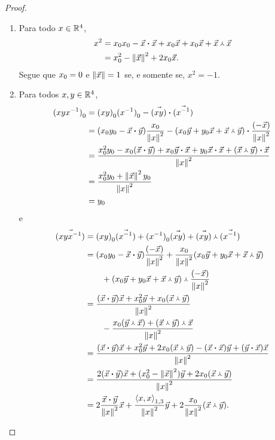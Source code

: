 \begin{proof}
\begin{enumerate}
	\item Para todo $x \in \mathbb{R}^4$,
		\begin{align*}
		x^2 &= {x}_0{x}_0 - {\vec{x}} \bm{\cdot} {\vec{x}}+{x}_0\vec{x}+{x}_0\vec{x}+{\vec{x}} \Yup {\vec{x}} \\
			&= {x}_0^2 - \left\Vert{\vec{x}}\right\Vert^2 + 2{x}_0\vec{x}.
		\end{align*}
Segue que ${x}_0=0$ e $\left\Vert{\vec{x}}\right\Vert=1$ se, e somente se, $x^2=-1$.

	\item Para todos $x,y \in \mathbb{R}^4$,
		\begin{align*}
		{(xyx^{-1})}_0 &= {(xy)}_0{(x^{-1})}_0 - {\vec{(xy)}} \bm{\cdot} {\vec{(x^{-1})}} \\
			&= ({x}_0{y}_0 - {\vec{x}} \bm{\cdot} {\vec{y}})\frac{{x}_0}{\left\Vert{x}\right\Vert^2} - {({x}_0\vec{y} + {y}_0\vec{x} + {\vec{x}} \Yup {\vec{y}})} \bm{\cdot} {\frac{(-\vec{x})}{\left\Vert{x}\right\Vert^2}} \\
			&= \frac{{x}_0^2{y}_0 - {x}_0({\vec{x}} \bm{\cdot} {\vec{y}}) + {x}_0{\vec{y}} \bm{\cdot} {\vec{x}} + {y}_0{\vec{x}} \bm{\cdot} {\vec{x}} + {({\vec{x}} \Yup {\vec{y}})} \bm{\cdot} {\vec{x}}}{\left\Vert{x}\right\Vert^2} \\
			&= \frac{{x}_0^2{y}_0 + \left\Vert{\vec{x}}\right\Vert^2{y}_0}{\left\Vert{x}\right\Vert^2} \\
			&= {y}_0
		\end{align*}
e
		\begin{align*}
		\vec{(xyx^{-1})} &= {(xy)}_0\vec{(x^{-1})} + {(x^{-1})}_0\vec{(xy)} + {\vec{(xy)}} \Yup {\vec{(x^{-1})}} \\
			&= ({x}_0{y}_0 - {\vec{x}} \bm{\cdot} {\vec{y}})\frac{(-\vec{x})}{\left\Vert{x}\right\Vert^2} 
			+ \frac{{x}_0}{\left\Vert{x}\right\Vert^2}({x}_0\vec{y} + {y}_0\vec{x} + {\vec{x}} \Yup {\vec{y}}) \\
				&\qquad + {({x}_0\vec{y} + {y}_0\vec{x} + {\vec{x}} \Yup {\vec{y}})} \Yup {\frac{(-\vec{x})}{\left\Vert{x}\right\Vert^2}} \\
			&= \frac{({\vec{x}} \bm{\cdot} {\vec{y}})\vec{x} + {x}_0^2\vec{y} + {x}_0({\vec{x}} \Yup {\vec{y}})}{\left\Vert{x}\right\Vert^2} \\
				&\qquad - \frac{{x}_0({\vec{y}} \Yup {\vec{x})} + {({\vec{x}} \Yup {\vec{y}})} \Yup {\vec{x}}}{\left\Vert{x}\right\Vert^2} \\
			&= \frac{({\vec{x}} \bm{\cdot} {\vec{y}})\vec{x}+ {x}_0^2\vec{y} + 2{x}_0({\vec{x}} \Yup {\vec{y}}) - ({\vec{x}} \bm{\cdot} {\vec{x}})\vec{y} + ({\vec{y}} \bm{\cdot} {\vec{x}})\vec{x}}{\left\Vert{x}\right\Vert^2} \\
			&= \frac{2({\vec{x}} \bm{\cdot} {\vec{y}})\vec{x} + ({x}_0^2-\left\Vert{\vec{x}}\right\Vert^2)\vec{y} + 2{x}_0({\vec{x}} \Yup {\vec{y}})}{\left\Vert{x}\right\Vert^2} \\
			&= 2\frac{{\vec{x}} \bm{\cdot} {\vec{y}}}{\left\Vert{x}\right\Vert^2}\vec{x} + \frac{\left\langle{x},{x}\right\rangle_{1,3}}{\left\Vert{x}\right\Vert^2}\vec{y} + 2\frac{{x}_0}{\left\Vert{x}\right\Vert^2}({\vec{x}} \Yup {\vec{y}}).
		\end{align*}


\end{enumerate}
\end{proof}
